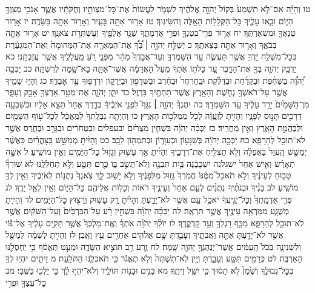 \documentclass[twoside, openany, parskip=half, 11pt]{book}
\begin{document}
טו וְהָיָ֗ה אִם־לֹ֤א תִשְׁמַע֙ בְּקוֹל֙ יְהֹוָ֣ה אֱלֹהֶ֔יךָ לִשְׁמֹ֤ר לַעֲשׂוֹת֙ אֶת־כׇּל־מִצְוֺתָ֣יו וְחֻקֹּתָ֔יו אֲשֶׁ֛ר אָנֹכִ֥י מְצַוְּךָ֖ הַיּ֑וֹם וּבָ֧אוּ עָלֶ֛יךָ כׇּל־הַקְּלָל֥וֹת הָאֵ֖לֶּה וְהִשִּׂיגֽוּךָ׃ טז אָר֥וּר אַתָּ֖ה בָּעִ֑יר וְאָר֥וּר אַתָּ֖ה בַּשָּׂדֶֽה׃ יז אָר֥וּר טַנְאֲךָ֖ וּמִשְׁאַרְתֶּֽךָ׃ יח אָר֥וּר פְּרִֽי־בִטְנְךָ֖ וּפְרִ֣י אַדְמָתֶ֑ךָ שְׁגַ֥ר אֲלָפֶ֖יךָ וְעַשְׁתְּרֹ֥ת צֹאנֶֽךָ׃ יט אָר֥וּר אַתָּ֖ה בְּבֹאֶ֑ךָ וְאָר֥וּר אַתָּ֖ה בְּצֵאתֶֽךָ׃ כ יְשַׁלַּ֣ח יְהֹוָ֣ה ׀ בְּ֠ךָ֠ אֶת־הַמְּאֵרָ֤ה אֶת־הַמְּהוּמָה֙ וְאֶת־הַמִּגְעֶ֔רֶת בְּכׇל־מִשְׁלַ֥ח יָדְךָ֖ אֲשֶׁ֣ר תַּעֲשֶׂ֑ה עַ֣ד הִשָּׁמֶדְךָ֤ וְעַד־אֲבׇדְךָ֙ מַהֵ֔ר מִפְּנֵ֛י רֹ֥עַ מַֽעֲלָלֶ֖יךָ אֲשֶׁ֥ר עֲזַבְתָּֽנִי׃ כא יַדְבֵּ֧ק יְהֹוָ֛ה בְּךָ֖ אֶת־הַדָּ֑בֶר עַ֚ד כַּלֹּת֣וֹ אֹֽתְךָ֔ מֵעַל֙ הָאֲדָמָ֔ה אֲשֶׁר־אַתָּ֥ה בָא־שָׁ֖מָּה לְרִשְׁתָּֽהּ׃ כב יַכְּכָ֣ה יְ֠הֹוָ֠ה בַּשַּׁחֶ֨פֶת וּבַקַּדַּ֜חַת וּבַדַּלֶּ֗קֶת וּבַֽחַרְחֻר֙ וּבַחֶ֔רֶב וּבַשִּׁדָּפ֖וֹן וּבַיֵּרָק֑וֹן וּרְדָפ֖וּךָ עַ֥ד אׇבְדֶֽךָ׃ כג וְהָי֥וּ שָׁמֶ֛יךָ אֲשֶׁ֥ר עַל־רֹאשְׁךָ֖ נְחֹ֑שֶׁת וְהָאָ֥רֶץ אֲשֶׁר־תַּחְתֶּ֖יךָ בַּרְזֶֽל׃ כד יִתֵּ֧ן יְהֹוָ֛ה אֶת־מְטַ֥ר אַרְצְךָ֖ אָבָ֣ק וְעָפָ֑ר מִן־הַשָּׁמַ֙יִם֙ יֵרֵ֣ד עָלֶ֔יךָ עַ֖ד הִשָּׁמְדָֽךְ׃ כה יִתֶּנְךָ֨ יְהֹוָ֥ה ׀ נִגָּף֮ לִפְנֵ֣י אֹיְבֶ֒יךָ֒ בְּדֶ֤רֶךְ אֶחָד֙ תֵּצֵ֣א אֵלָ֔יו וּבְשִׁבְעָ֥ה דְרָכִ֖ים תָּנ֣וּס לְפָנָ֑יו וְהָיִ֣יתָ לְזַֽעֲוָ֔ה לְכֹ֖ל מַמְלְכ֥וֹת הָאָֽרֶץ׃ כו וְהָיְתָ֤ה נִבְלָֽתְךָ֙ לְמַֽאֲכָ֔ל לְכׇל־ע֥וֹף הַשָּׁמַ֖יִם וּלְבֶהֱמַ֣ת הָאָ֑רֶץ וְאֵ֖ין מַחֲרִֽיד׃ כז יַכְּכָ֨ה יְהֹוָ֜ה בִּשְׁחִ֤ין מִצְרַ֙יִם֙ ובעפלים וּבַטְּחֹרִ֔ים וּבַגָּרָ֖ב וּבֶחָ֑רֶס אֲשֶׁ֥ר לֹא־תוּכַ֖ל לְהֵרָפֵֽא׃ כח יַכְּכָ֣ה יְהֹוָ֔ה בְּשִׁגָּע֖וֹן וּבְעִוָּר֑וֹן וּבְתִמְה֖וֹן לֵבָֽב׃ כט וְהָיִ֜יתָ מְמַשֵּׁ֣שׁ בַּֽצׇּהֳרַ֗יִם כַּאֲשֶׁ֨ר יְמַשֵּׁ֤שׁ הַֽעִוֵּר֙ בָּאֲפֵלָ֔ה וְלֹ֥א תַצְלִ֖יחַ אֶת־דְּרָכֶ֑יךָ וְהָיִ֜יתָ אַ֣ךְ עָשׁ֧וּק וְגָז֛וּל כׇּל־הַיָּמִ֖ים וְאֵ֥ין מוֹשִֽׁיעַ׃ ל אִשָּׁ֣ה תְאָרֵ֗שׂ וְאִ֤ישׁ אַחֵר֙ ישגלנה יִשְׁכָּבֶ֔נָּה בַּ֥יִת תִּבְנֶ֖ה וְלֹא־תֵשֵׁ֣ב בּ֑וֹ כֶּ֥רֶם תִּטַּ֖ע וְלֹ֥א תְחַלְּלֶֽנּוּ׃ לא שׁוֹרְךָ֞ טָב֣וּחַ לְעֵינֶ֗יךָ וְלֹ֣א תֹאכַל֮ מִמֶּ֒נּוּ֒ חֲמֹֽרְךָ֙ גָּז֣וּל מִלְּפָנֶ֔יךָ וְלֹ֥א יָשׁ֖וּב לָ֑ךְ צֹֽאנְךָ֙ נְתֻנ֣וֹת לְאֹיְבֶ֔יךָ וְאֵ֥ין לְךָ֖ מוֹשִֽׁיעַ׃ לב בָּנֶ֨יךָ וּבְנֹתֶ֜יךָ נְתֻנִ֨ים לְעַ֤ם אַחֵר֙ וְעֵינֶ֣יךָ רֹא֔וֹת וְכָל֥וֹת אֲלֵיהֶ֖ם כׇּל־הַיּ֑וֹם וְאֵ֥ין לְאֵ֖ל יָדֶֽךָ׃ לג פְּרִ֤י אַדְמָֽתְךָ֙ וְכׇל־יְגִ֣יעֲךָ֔ יֹאכַ֥ל עַ֖ם אֲשֶׁ֣ר לֹא־יָדָ֑עְתָּ וְהָיִ֗יתָ רַ֛ק עָשׁ֥וּק וְרָצ֖וּץ כׇּל־הַיָּמִֽים׃ לד וְהָיִ֖יתָ מְשֻׁגָּ֑ע מִמַּרְאֵ֥ה עֵינֶ֖יךָ אֲשֶׁ֥ר תִּרְאֶֽה׃ לה יַכְּכָ֨ה יְהֹוָ֜ה בִּשְׁחִ֣ין רָ֗ע עַל־הַבִּרְכַּ֙יִם֙ וְעַל־הַשֹּׁקַ֔יִם אֲשֶׁ֥ר לֹא־תוּכַ֖ל לְהֵרָפֵ֑א מִכַּ֥ף רַגְלְךָ֖ וְעַ֥ד קׇדְקֳדֶֽךָ׃ לו יוֹלֵ֨ךְ יְהֹוָ֜ה אֹתְךָ֗ וְאֶֽת־מַלְכְּךָ֙ אֲשֶׁ֣ר תָּקִ֣ים עָלֶ֔יךָ אֶל־גּ֕וֹי אֲשֶׁ֥ר לֹא־יָדַ֖עְתָּ אַתָּ֣ה וַאֲבֹתֶ֑יךָ וְעָבַ֥דְתָּ שָּׁ֛ם אֱלֹהִ֥ים אֲחֵרִ֖ים עֵ֥ץ וָאָֽבֶן׃ לז וְהָיִ֣יתָ לְשַׁמָּ֔ה לְמָשָׁ֖ל וְלִשְׁנִינָ֑ה בְּכֹל֙ הָֽעַמִּ֔ים אֲשֶׁר־יְנַהֶגְךָ֥ יְהֹוָ֖ה שָֽׁמָּה׃ לח זֶ֥רַע רַ֖ב תּוֹצִ֣יא הַשָּׂדֶ֑ה וּמְעַ֣ט תֶּאֱסֹ֔ף כִּ֥י יַחְסְלֶ֖נּוּ הָאַרְבֶּֽה׃ לט כְּרָמִ֥ים תִּטַּ֖ע וְעָבָ֑דְתָּ וְיַ֤יִן לֹֽא־תִשְׁתֶּה֙ וְלֹ֣א תֶאֱגֹ֔ר כִּ֥י תֹאכְלֶ֖נּוּ הַתֹּלָֽעַת׃ מ זֵיתִ֛ים יִהְי֥וּ לְךָ֖ בְּכׇל־גְּבוּלֶ֑ךָ וְשֶׁ֙מֶן֙ לֹ֣א תָס֔וּךְ כִּ֥י יִשַּׁ֖ל זֵיתֶֽךָ׃ מא בָּנִ֥ים וּבָנ֖וֹת תּוֹלִ֑יד וְלֹא־יִהְי֣וּ לָ֔ךְ כִּ֥י יֵלְכ֖וּ בַּשֶּֽׁבִי׃ מב כׇּל־עֵצְךָ֖ וּפְרִ֣י 
\end{document}
